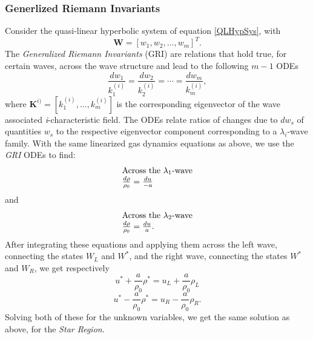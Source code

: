 \documentclass[]{article}
\begin{document}
		\subsubsection{Generlized Riemann Invariants}
			Consider the quasi-linear hyperbolic system of equation \ref{QLHypSys}, with
			\begin{equation}
				\textbf{W} = [w_1, w_2,..., w_m]^T.
			\end{equation}
			The \textit{Generalized Riemann Invariants} (GRI) are relations that hold true, for certain waves, across the wave structure and lead to the following $ m-1 $ ODEs
			\begin{equation}
				\frac{dw_1}{k_1^{(i)}} = \frac{dw_2}{k_2^{(i)}} = \cdots = \frac{dw_m}{k_m^{(i)}},
			\end{equation}
			where $ \textbf{K}^{i)} = [k_1^{(i)},...,k_m^{(i)}]$ is the corresponding eigenvector of the wave associated \textit{i}-characteristic field. The ODEs relate ratios of changes due to $ dw_s $ of quantities $ w_s $ to the respective eigenvector component corresponding to a $ \lambda_i $-wave family. With the same linearized gas dynamics equations as above, we use the \textit{GRI} ODEs to find:
			\begin{equation}
				\begin{aligned}
				\begin{array}{ll}
					\mbox{Across the $ \lambda_1 $-wave} \\
					\frac{d\rho}{\rho_0} = \frac{du}{-a}
				\end{array}
				\end{aligned}			
			\end{equation}
			and
			\begin{equation} 
				\begin{aligned}
				\begin{array}{ll}
					\mbox{Across the $ \lambda_2 $-wave} \\
					\frac{d\rho}{\rho_0} = \frac{du}{a}.
				\end{array}
				\end{aligned}			
			\end{equation}
			After integrating these equations and applying them across the left wave, connecting the states $ W_L $ and $ W^* $, and the right wave, connecting the states $ W^* $ and $ W_R $, we get respectively
			\begin{equation}
				u^* + \frac{a}{\rho_0} \rho^* = u_L + \frac{a}{\rho_0}\rho_L
			\end{equation}
			\begin{equation}
				u^* - \frac{a}{\rho_0} \rho^* = u_R - \frac{a}{\rho_0}\rho_R.
			\end{equation}
			Solving both of these for the unknown variables, we get the same solution as above, for the \textit{Star Region}.
		
\end{document}
